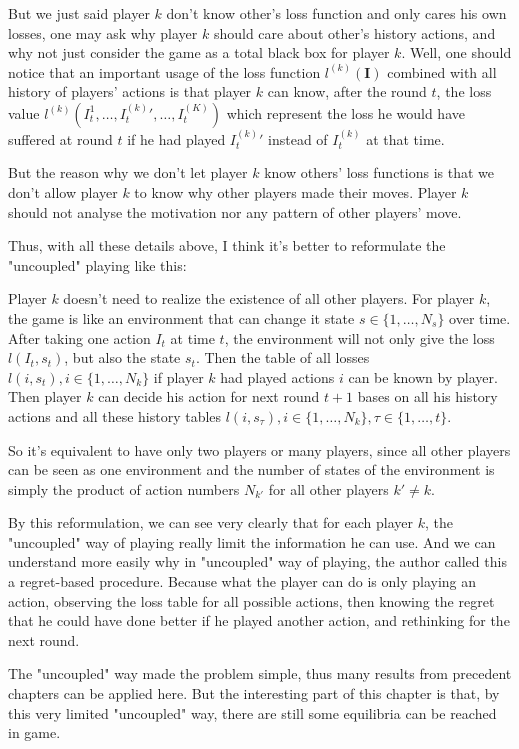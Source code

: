 \documentclass{article} %
\begin{document}
But we just said player $k$ don't know other's loss function and only cares his own losses, one may ask why player $k$ should care about other's history actions, and why not just consider the game as a total black box for player $k$. Well, one should notice that an important usage of the loss function $l^{(k)}(\mathbf{I})$ combined with all history of players' actions is that player $k$ can know, after the round $t$, the loss value $l^{(k)}(I^1_t,\dots,{I^{(k)}_t}',\dots, I^{(K)}_t)$ which represent the loss he would have suffered at round $t$ if he had played ${I^{(k)}_t}'$ instead of $I^{(k)}_t$ at that time.

But the reason why we don't let player $k$ know others' loss functions is that we don't allow player $k$ to know why other players made their moves. Player $k$ should not analyse the motivation nor any pattern of other players' move.

Thus, with all these details above, I think it's better to reformulate the "uncoupled" playing like this: 

Player $k$ doesn't need to realize the existence of all other players. For player $k$, the game is like an environment that can change it state $s\in\{1,\dots,N_s\}$ over time. After taking one action $I_t$ at time $t$, the environment will not only give the loss $l(I_t, s_t)$, but also the state $s_t$. Then the table of all losses $l(i, s_t), i\in\{1,\dots,N_k\}$ if player $k$ had played actions $i$ can be known by player. Then player $k$ can decide his action for next round $t+1$ bases on all his history actions and all these history tables $l(i, s_\tau), i\in\{1,\dots,N_k\}, \tau\in\{1,\dots,t\}$.

So it's equivalent to have only two players or many players, since all other players can be seen as one environment and the number of states of the environment is simply the product of action numbers $N_{k'}$ for all other players $k'\neq k$.

By this reformulation, we can see very clearly that for each player $k$, the "uncoupled" way of playing really limit the information he can use. And we can understand more easily why in "uncoupled" way of playing, the author called this a regret-based procedure. Because what the player can do is only playing an action, observing the loss table for all possible actions, then knowing the regret that he could have done better if he played another action, and rethinking for the next round.

The "uncoupled" way made the problem simple, thus many results from precedent chapters can be applied here. But the interesting part of this chapter is that, by this very limited "uncoupled" way, there are still some equilibria can be reached in game.
\end{document}
